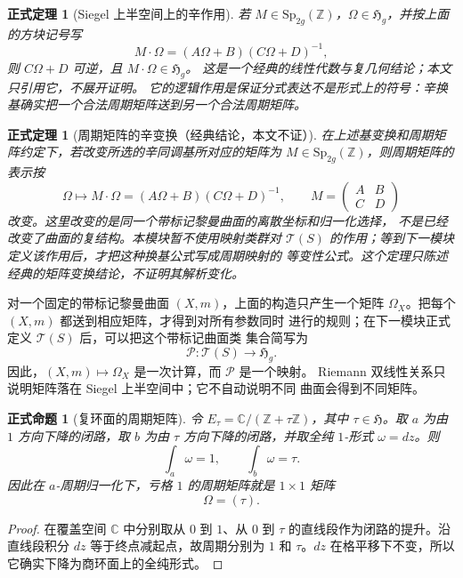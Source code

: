 \documentclass[UTF8,fontset=none,a4paper,11pt]{ctexart}
\theoremstyle{foundation-definition}
\theoremstyle{foundation-theorem}
\newtheorem{theorem}[definition]{正式定理}
\theoremstyle{foundation-proposition}
\newtheorem{proposition}[definition]{正式命题}
\theoremstyle{foundation-example}
\theoremstyle{foundation-remark}
\theoremstyle{foundation-theorem}
\newcommand{\C}{\mathbb C}
\newcommand{\T}{\mathcal T}
\begin{document}
\begin{theorem}[Siegel 上半空间上的辛作用]\label{thm:siegel-action-well-defined}
若 \(M\in\mathrm{Sp}_{2g}(\mathbb Z)\)，\(\Omega\in\mathfrak H_g\)，并按上面的方块记号写
\[
M\cdot\Omega=(A\Omega+B)(C\Omega+D)^{-1},
\]
则 \(C\Omega+D\) 可逆，且 \(M\cdot\Omega\in\mathfrak H_g\)。
这是一个经典的线性代数与复几何结论；本文只引用它，不展开证明。
它的逻辑作用是保证分式表达不是形式上的符号：辛换基确实把一个合法周期矩阵送到另一个合法周期矩阵。
\end{theorem}

\begin{theorem}[周期矩阵的辛变换（经典结论，本文不证）]
在上述基变换和周期矩阵约定下，若改变所选的辛同调基所对应的矩阵为
\(M\in\mathrm{Sp}_{2g}(\mathbb Z)\)，则周期矩阵的表示按
\[
\Omega\longmapsto M\cdot\Omega
=(A\Omega+B)(C\Omega+D)^{-1},
\qquad
M=\begin{pmatrix}A&B\\C&D\end{pmatrix}
\]
改变。这里改变的是同一个带标记黎曼曲面的离散坐标和归一化选择，
不是已经改变了曲面的复结构。本模块暂不使用映射类群对
\(\T(S)\) 的作用；等到下一模块定义该作用后，才把这种换基公式写成周期映射的
等变性公式。这个定理只陈述经典的矩阵变换结论，不证明其解析变化。
\end{theorem}

对一个固定的带标记黎曼曲面 \((X,m)\)，上面的构造只产生一个矩阵
\(\Omega_X\)。把每个 \((X,m)\) 都送到相应矩阵，才得到对所有参数同时
进行的规则；在下一模块正式定义 \(\T(S)\) 后，可以把这个带标记曲面类
集合简写为
\[
\mathcal P:\T(S)\longrightarrow\mathfrak H_g.
\]
因此，\((X,m)\mapsto\Omega_X\) 是一次计算，而 \(\mathcal P\) 是一个映射。
Riemann 双线性关系只说明矩阵落在 Siegel 上半空间中；它不自动说明不同
曲面会得到不同矩阵。

\begin{proposition}[复环面的周期矩阵]
令 \(E_\tau=\mathbb C/(\mathbb Z+\tau\mathbb Z)\)，其中 \(\tau\in\mathfrak H\)。取 \(a\) 为由 \(1\) 方向下降的闭路，取 \(b\) 为由 \(\tau\) 方向下降的闭路，并取全纯 \(1\)-形式 \(\omega=dz\)。则
\[
\int_a\omega=1,\qquad
\int_b\omega=\tau.
\]
因此在 \(a\)-周期归一化下，亏格 \(1\) 的周期矩阵就是 \(1\times1\) 矩阵
\[
\Omega=(\tau).
\]
\end{proposition}

\begin{proof}
在覆盖空间 \(\mathbb C\) 中分别取从 \(0\) 到 \(1\)、从 \(0\) 到 \(\tau\) 的直线段作为闭路的提升。沿直线段积分 \(dz\) 等于终点减起点，故周期分别为 \(1\) 和 \(\tau\)。\(dz\) 在格平移下不变，所以它确实下降为商环面上的全纯形式。
\end{proof}
\end{document}
